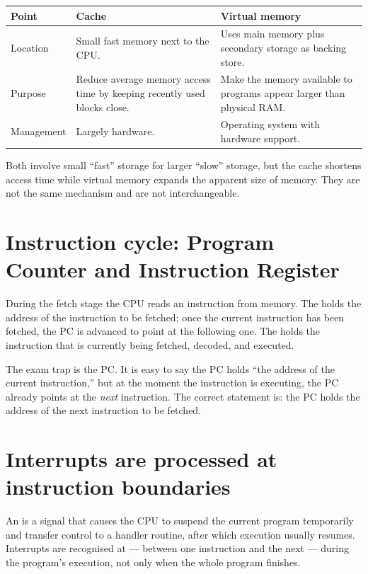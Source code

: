 \documentclass[11pt]{article}
\begin{document}
\begin{center}
\begin{tabular}{p{}p{}p{}}
\toprule
\textbf{Point} & \textbf{Cache} & \textbf{Virtual memory} \\
\midrule
Location & Small fast memory next to the CPU. & Uses main memory plus secondary storage as backing store. \\
Purpose & Reduce average memory access time by keeping recently used blocks close. & Make the memory available to programs appear larger than physical RAM. \\
Management & Largely hardware. & Operating system with hardware support. \\
\bottomrule
\end{tabular}
\end{center}

Both involve small ``fast'' storage for larger ``slow'' storage, but the cache
shortens access time while virtual memory expands the apparent size of memory.
They are not the same mechanism and are not interchangeable.

\section{Instruction cycle: Program Counter and Instruction Register}
During the fetch stage the CPU reads an instruction from memory. The
 holds the address of the  instruction to
be fetched; once the current instruction has been fetched, the PC is advanced
to point at the following one. The  holds the
instruction that is currently being fetched, decoded, and executed.

The exam trap is the PC. It is easy to say the PC holds ``the address of the
current instruction,'' but at the moment the instruction is executing, the PC
already points at the \emph{next} instruction. The correct statement is: the
PC holds the address of the next instruction to be fetched.

\section{Interrupts are processed at instruction boundaries}
An  is a signal that causes the CPU to suspend the current
program temporarily and transfer control to a handler routine, after which
execution usually resumes. Interrupts are recognised at  --- between one instruction and the next --- during the program's
execution, not only when the whole program finishes.
\end{document}
